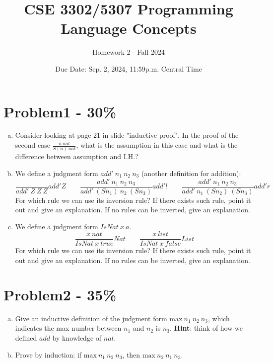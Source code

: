 \documentclass{article}
\newcommand{\answerbox}{
    \vspace{7cm} %
}
\newcommand{\answerboxsmall}{
    \vspace{3cm} %
}
\begin{document}
\title{CSE 3302/5307 Programming Language Concepts}
\author{Homework 2 - Fall 2024}
\date{Due Date: Sep. 2, 2024, 11:59p.m. Central Time}
\maketitle
\thispagestyle{fancy}

\section*{Problem1 - 30\%}
\fontsize{12pt}{0}
\begin{enumerate}[(a)]    
    \item Consider looking at page 21 in slide "inductive-proof". In the proof of the second case $\frac{n\ nat}{S(n)\ nat}$, what is the assumption in this case and what is the difference between assumption and I.H.?
    \answerboxsmall

    \item We define a judgment form $add'\ n_{1}\ n_{2}\ n_{3}$ (another definition for addition):
    \[
    \frac{}{add'\ Z\ Z\ Z}add'Z
    \qquad
    \frac{add'\ n_{1}\ n_{2}\ n_{3}}{add'\ (S n_{1})\ n_{2}\ (S n_{3})}add'l
    \qquad
    \frac{add'\ n_{1}\ n_{2}\ n_{3}}{add'\ n_{1}\ (S n_{2})\ (S n_{3})}add'r
    \]
    For which rule we can use its inversion rule? If there exists such rule, point it out and give an explanation. If no rules can be inverted, give an explanation. 
    \answerboxsmall

    \item We define a judgment form $IsNat\ x\ a$.
    \[
    \frac{x\ nat}{IsNat\ x\ true}Nat
    \qquad
    \frac{x\ list}{IsNat\ x\ false}List
    \]
    For which rule we can use its inversion rule? If there exists such rule, point it out and give an explanation. If no rules can be inverted, give an explanation.
    \answerboxsmall
\end{enumerate}

\section*{Problem2 - 35\%}

\begin{enumerate}[(a)]
    \item Give an inductive definition of the judgment form
    $\mbox{max}\ n_1\ n_2\ n_3$, which indicates the max number between $n_1$ and $n_2$ is $n_3$. 
    \newline
    \textbf{Hint}: think of how we defined $add$ by knowledge of $nat$. 
    \answerboxsmall

    \item Prove by induction:
    if $\mbox{max}\ n_1\ n_2\ n_3$, then  $\mbox{max}\ n_2\ n_1\ n_3$.
    \answerbox
\end{enumerate}
\end{document}
